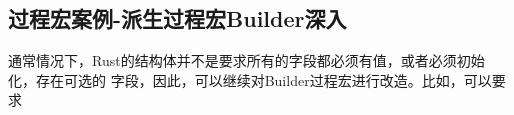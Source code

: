 \subsection{过程宏案例-派生过程宏Builder深入}
通常情况下，Rust的结构体并不是要求所有的字段都必须有值，或者必须初始化，存在可选的
字段，因此，可以继续对Builder过程宏进行改造。比如，可以要求

%


